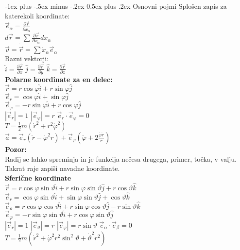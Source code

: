 \documentclass[12pt,landscape]{article}
\makeatletter
\renewcommand{\section}{\@startsection{section}{1}{0mm}%
                                {-1ex plus -.5ex minus -.2ex}%
                                {0.5ex plus .2ex}%
                                {\normalfont\large\bfseries}}
\newcommand{\rv}{\vec{r}}
\newcommand{\vv}{\vec{v}}
\newcommand{\av}{\vec{a}}
\makeatother
\begin{document}
\raggedright
\footnotesize
\begin{multicols}{3}
\setlength{\premulticols}{1pt}
\setlength{\postmulticols}{1pt}
\setlength{\multicolsep}{1pt}
\setlength{\columnsep}{2pt}

\section{Osnovni pojmi}
Splošen zapis za katerekoli koordinate: \\
$\vec e_\alpha = \frac{\partial \rv}{\partial x_\alpha}$ \\
$d \rv = \sum \frac{\partial \rv}{\partial x_\alpha} d x_\alpha$ \\
$\vv = \dot \rv = \sum \dot x_\alpha \vec e_\alpha$  \\
Bazni vektorji: \\
$\hat{i}=\frac{\partial \vec{r}}{\partial x}$
$\hat{j}=\frac{\partial \vec{r}}{\partial y}$
$\hat{k}=\frac{\partial \vec{r}}{\partial z}$ \medskip \\
\textbf{Polarne koordinate za en delec:} \\ 
$\rv = r \cos \varphi \hat i + r \sin \varphi \hat j$ \\
$\vec e_r = \cos \varphi \hat i + \sin \varphi \hat j$ \\
$\vec e_\varphi = - r \sin \varphi \hat i + r \cos \varphi \hat j$ \\
$|\vec e_r| = 1$ \qquad $|\vec e_\varphi| = r$ \qquad $\vec e_r \cdot \vec e_\varphi = 0$ \\
$T= \frac{1}{2} m (\dot{r}^2 + r^2 \dot{\varphi}^2)$ \\
$\av = \vec e_r \left(\ddot r - \dot{\varphi}^2 r\right) + \vec e_\varphi \left(\ddot \varphi + 2 \frac{\dot \varphi \dot r}{r}\right)$  \\
\textbf{Pozor:} \\
Radij se lahko spreminja in je funkcija nečesa drugega, primer, točka, v valju. Takrat raje zapiši navadne koordinate.\medskip \\
\textbf{Sferične koordinate} \\
$\rv = r \cos \varphi \sin \vartheta \hat i + r \sin \varphi \sin \vartheta \hat j + r \cos \vartheta \hat k$ \\
$\vec e_r =  \cos \varphi \sin \vartheta \hat i + \sin \varphi \sin \vartheta \hat j + \cos \vartheta \hat k$ \\
$\vec e_\vartheta =  r \cos \varphi \cos \vartheta \hat i + r \sin \varphi \cos \vartheta \hat j - r \sin \vartheta \hat k$ \\
$\vec e_\varphi =  -r \sin \varphi \sin \vartheta \hat i + r \cos \varphi \sin \vartheta \hat j$ \\
$|\vec e_r| = 1$ \qquad $|\vec e_\vartheta| = r$ \qquad $|\vec e_\varphi| = r \sin \vartheta$ \qquad $\vec e_\alpha \cdot \vec e_\beta = 0$ \\
$T = \frac{1}{2} m (\dot{r}^2 + \dot{\varphi}^2 r^2 \sin^2 \vartheta + \dot{\vartheta}^2 r^2)$ \medskip \\


\end{multicols}
\end{document}
